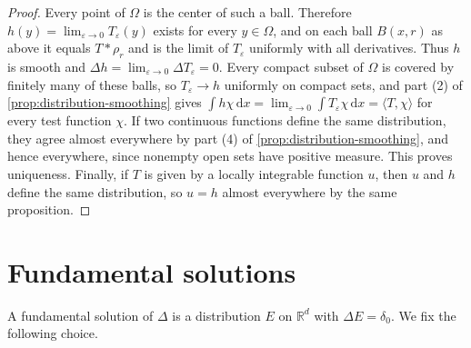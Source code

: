 \begin{proof}
Every point of $\Omega$ is the center of such a ball. Therefore $h(y)=\lim_{\varepsilon\to0}T_\varepsilon(y)$ exists for every $y\in\Omega$, and on each ball $B(x,r)$ as above it equals $T*\rho_r$ and is the limit of $T_\varepsilon$ uniformly with all derivatives. Thus $h$ is smooth and $\Delta h=\lim_{\varepsilon\to0}\Delta T_\varepsilon=0$. Every compact subset of $\Omega$ is covered by finitely many of these balls, so $T_\varepsilon\to h$ uniformly on compact sets, and part (2) of \cref{prop:distribution-smoothing} gives $\int h\chi\,\mathrm dx=\lim_{\varepsilon\to0}\int T_\varepsilon\chi\,\mathrm dx=\langle T,\chi\rangle$ for every test function $\chi$. If two continuous functions define the same distribution, they agree almost everywhere by part (4) of \cref{prop:distribution-smoothing}, and hence everywhere, since nonempty open sets have positive measure. This proves uniqueness. Finally, if $T$ is given by a locally integrable function $u$, then $u$ and $h$ define the same distribution, so $u=h$ almost everywhere by the same proposition.
\end{proof}

\section{Fundamental solutions}
\label{sec:fundamental-solutions}
A fundamental solution of $\Delta$ is a distribution $E$ on $\mathbb R^d$ with $\Delta E=\delta_0$. We fix the following choice.

